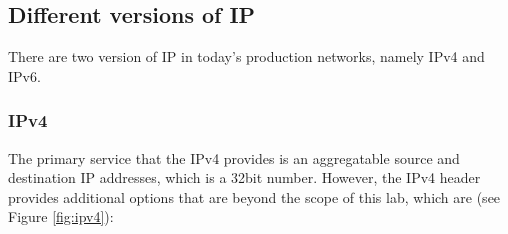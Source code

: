 \documentclass[pdftex,12pt,a4paper]{article}
\begin{document}
        \subsection{Different versions of IP}
            There are two version of IP in today's production networks, namely
            IPv4 and IPv6.

            \subsubsection{IPv4}
                The primary service that the IPv4 provides is an aggregatable
                source and destination IP addresses, which is a 32bit number.
                However, the IPv4 header provides additional options that are
                beyond the scope of this lab, which are (see Figure
                \ref{fig:ipv4}):
\end{document}
